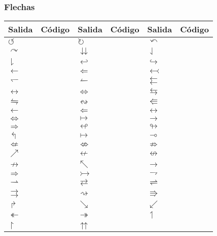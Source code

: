 \documentclass{article}
\numberwithin{equation}{section}
\theoremstyle{plain}
\theoremstyle{definition}
\theoremstyle{remark}
\def\X#1{$#1$ & \texttt{#1}} %
\begin{document}
\subsubsection{Flechas}

\begin{table}[H]
\centering
\begin{tabular}{@{}*6l@{}}
\toprule
Salida & Código & Salida & Código & Salida & Código \\
\midrule
\X{\circlearrowleft} & 
\X{\circlearrowright} & 
\X{\curvearrowleft} \\
\X{\curvearrowright} & 
\X{\downdownarrows} & 
\X{\downharpoonleft} \\ 
\X{\downharpoonright} & 
\X{\hookleftarrow} & 
\X{\hookrightarrow} \\
\X{\leftarrow} & 
\X{\Leftarrow} & 
\X{\leftarrowtail} \\
\X{\leftharpoondown} & 
\X{\leftharpoonup} & 
\X{\leftleftarrows} \\ 
\X{\leftrightarrow} & 
\X{\Leftrightarrow} & 
\X{\leftrightarrows} \\ 
\X{\leftrightharpoons} & 
\X{\leftrightsquigarrow} & 
\X{\Lleftarrow} \\
\X{\longleftarrow} & 
\X{\Longleftarrow} & 
\X{\longleftrightarrow} \\ 
\X{\Longleftrightarrow} & 
\X{\longmapsto} & 
\X{\longrightarrow} \\ 
\X{\Longrightarrow} & 
\X{\looparrowleft} & 
\X{\looparrowright} \\ 
\X{\Lsh} & 
\X{\mapsto} & 
\X{\multimap} \\ 
\X{\nLeftarrow} & 
\X{\nLeftrightarrow} & 
\X{\nRightarrow} \\
\X{\nearrow} & 
\X{\nleftarrow} & 
\X{\nleftrightarrow} \\ 
\X{\nrightarrow} & 
\X{\nwarrow} & 
\X{\rightarrow} \\ 
\X{\Rightarrow} & 
\X{\rightarrowtail} & 
\X{\rightharpoondown} \\ 
\X{\rightharpoonup} & 
\X{\rightleftarrows} & 
\X{\rightleftharpoons} \\ 
\X{\rightrightarrows} & 
\X{\rightsquigarrow} & 
\X{\Rrightarrow} \\
\X{\Rsh} & 
\X{\searrow} & 
\X{\swarrow} \\ 
\X{\twoheadleftarrow} & 
\X{\twoheadrightarrow} & 
\X{\upharpoonleft} \\ 
\X{\upharpoonright} & 
\X{\upuparrows} & \\
\bottomrule
\end{tabular}
\end{table}
\end{document}
